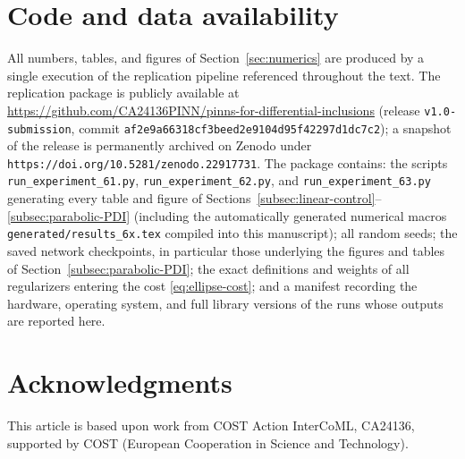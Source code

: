 \documentclass[11pt]{elsarticle}
\theoremstyle{definition}
\theoremstyle{remark}
\numberwithin{equation}{section}
\begin{document}
\section*{Code and data availability}

All numbers, tables, and figures of Section~\ref{sec:numerics} are
produced by a single execution of the replication pipeline referenced
throughout the text. The replication package is publicly available at
\url{https://github.com/CA24136PINN/pinns-for-differential-inclusions}
(release \texttt{v1.0-submission}, commit \texttt{af2e9a66318cf3beed2e9104d95f42297d1dc7c2});
a snapshot of the release is permanently archived on Zenodo under
\texttt{https://doi.org/10.5281/zenodo.22917731}. The package contains: the scripts
\texttt{run\_experiment\_61.py}, \texttt{run\_experiment\_62.py}, and
\texttt{run\_experiment\_63.py} generating every table and figure of
Sections~\ref{subsec:linear-control}--\ref{subsec:parabolic-PDI}
(including the automatically generated numerical macros
\texttt{generated/results\_6x.tex} compiled into this manuscript); all
random seeds; the saved network checkpoints, in particular those
underlying the figures and tables of
Section~\ref{subsec:parabolic-PDI}; the exact definitions and weights of all
regularizers entering the cost \eqref{eq:ellipse-cost}; and a manifest
recording the hardware, operating system, and full library versions of
the runs whose outputs are reported here.


\section*{Acknowledgments}
This article is based upon work from COST Action InterCoML, CA24136, supported by COST (European Cooperation in Science and Technology).




\end{document}

